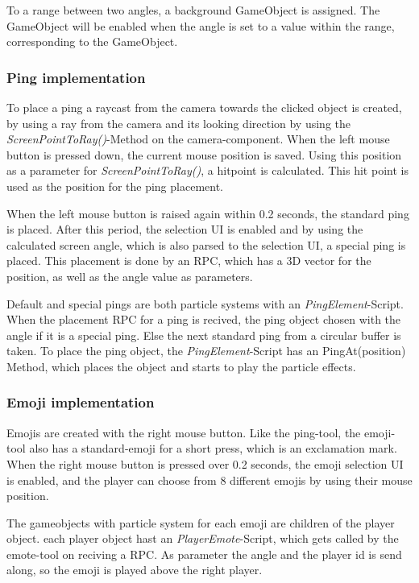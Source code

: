 To a range between two angles, a background GameObject is assigned. The GameObject will be enabled when the angle is set to a value within the range, corresponding to the GameObject.



\subsubsection{Ping implementation}

To place a ping a raycast from the camera towards the clicked object is created, by using a ray from the camera and its looking direction by using the \textit{ScreenPointToRay()}-Method on the camera-component. When the left mouse button is pressed down, the current mouse position is saved. Using this position as a parameter for \textit{ScreenPointToRay()}, a hitpoint is calculated. This hit point is used as the position for the ping placement.

When the left mouse button is raised again within 0.2 seconds, the standard ping is placed. After this period, the selection UI is enabled and by using the calculated screen angle, which is also parsed to the selection UI, a special ping is placed. This placement is done by an RPC, which has a 3D vector for the position, as well as the angle value as parameters.

Default and special pings are both particle systems with an \textit{PingElement}-Script.
When the placement RPC for a ping is recived, the ping object chosen with the angle if it is a special ping. Else the next standard ping from a circular buffer is taken. To place the ping object, the \textit{PingElement}-Script has an PingAt(position) Method, which places the object and starts to play the particle effects.

\subsubsection{Emoji implementation}

Emojis are created with the right mouse button. Like the ping-tool, the emoji-tool also has a standard-emoji for a short press, which is an exclamation mark.
When the right mouse button is pressed over 0.2 seconds, the emoji selection UI is enabled, and the player can choose from 8 different emojis by using their mouse position.

The gameobjects with particle system for each emoji are children of the player object.
each player object hast an \textit{PlayerEmote}-Script, which gets called by the emote-tool on reciving a RPC. As parameter the angle and the player id is send along, so the emoji is played above the right player.

